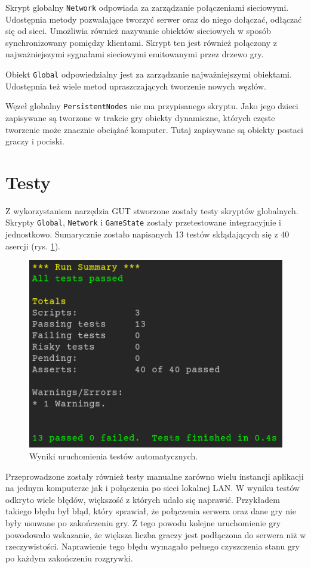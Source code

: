 Skrypt globalny \texttt{Network} odpowiada za zarządzanie połączeniami sieciowymi. Udostępnia metody pozwalające tworzyć serwer oraz do niego dołączać, odłączać się od sieci. Umożliwia również nazywanie obiektów sieciowych w sposób synchronizowany pomiędzy klientami. Skrypt ten jest również połączony z najważniejszymi sygnałami sieciowymi emitowanymi przez drzewo gry. 

Obiekt \texttt{Global} odpowiedzialny jest za zarządzanie najważniejszymi obiektami. Udostępnia też wiele metod upraszczających tworzenie nowych węzłów.

Węzeł globalny \texttt{PersistentNodes} nie ma przypisanego skryptu. Jako jego dzieci zapisywane są tworzone w trakcie gry obiekty dynamiczne, których częste tworzenie może znacznie obciążać komputer. Tutaj zapisywane są obiekty postaci graczy i pociski. 

\section{Testy}
Z wykorzystaniem narzędzia GUT stworzone zostały testy skryptów globalnych. Skrypty \texttt{Global}, \texttt{Network} i \texttt{GameState} zostały przetestowane integracyjnie i jednostkowo. Sumarycznie zostało napisanych 13 testów skłądających się z 40 asercji (rys. \ref{fig:test_results}).

\begin{figure}
    \centering
    \includegraphics[width=.5\linewidth]{Images/development/tests_result.png}
    \caption{Wyniki uruchomienia testów automatycznych.}
    \label{fig:test_results}
\end{figure}

Przeprowadzone zostały również testy manualne zarówno wielu instancji aplikacji na jednym komputerze jak i połączenia po sieci lokalnej LAN. W wyniku testów odkryto wiele błędów, większość z których udało się naprawić. Przykładem takiego błędu był błąd, który sprawiał, że połączenia serwera oraz dane gry nie były usuwane po zakończeniu gry. Z tego powodu kolejne uruchomienie gry powodowało wskazanie, że większa liczba graczy jest podłączona do serwera niż w rzeczywistości. Naprawienie tego błędu wymagało pełnego czyszczenia stanu gry po każdym zakończeniu rozgrywki.

